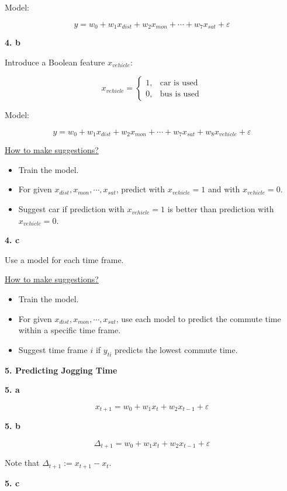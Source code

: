 \documentclass{article}
\begin{document}
Model:

\[
y=w_0+w_1x_{dist}+w_2x_{mon}+\cdots+w_7x_{sat}+\varepsilon
\]

\textbf{4. b}

Introduce a Boolean feature $x_{vehicle}$:

\[
x_{vehicle}=
\begin{cases}
1, & \text{car is used} \\
0, & \text{bus is used}
\end{cases}
\]

Model:

\[
y=w_0+w_1x_{dist}+w_2x_{mon}+\cdots+w_7x_{sat}+w_8x_{vehicle}+\varepsilon
\]

\underline{How to make suggestions?}

\begin{itemize}
    \item Train the model.
    \item For given $x_{dist}, x_{mon}, \cdots, x_{sat}$, predict with $x_{vehicle}=1$ and with $x_{vehicle}=0$.
    \item Suggest car if prediction with $x_{vehicle}=1$ is better than prediction with $x_{vehicle}=0$.
\end{itemize}

\textbf{4. c}

Use a model for each time frame.

\underline{How to make suggestions?}

\begin{itemize}
    \item Train the model.
    \item For given $x_{dist},x_{mon},\cdots,x_{sat}$, use each model to predict the commute time within a specific time frame.
    \item Suggest time frame $i$ if $y_{ti}$ predicts the lowest commute time.
\end{itemize}

\vspace{4mm}

\textbf{5. Predicting Jogging Time}

\textbf{5. a}

\[
x_{t+1}=w_0+w_1x_t+w_2x_{t-1}+\varepsilon
\]

\textbf{5. b}

\[
\Delta_{t+1}=w_0+w_1x_t+w_2x_{t-1}+\varepsilon
\]

Note that $\Delta_{t+1}:=x_{t+1}-x_t$.

\textbf{5. c}
\end{document}
